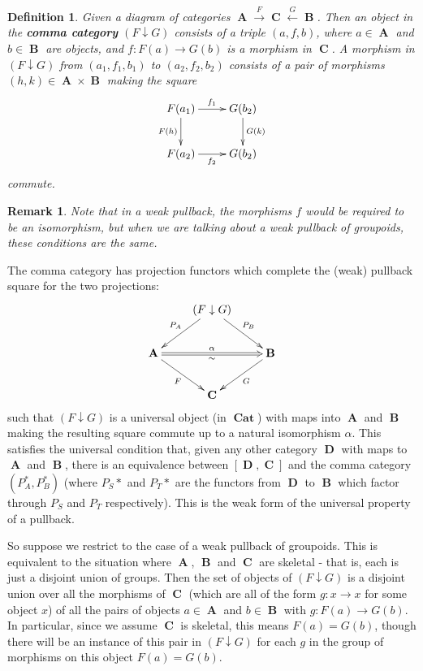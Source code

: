 \documentclass[10pt]{amsart}
\numberwithin{theorem}{subsection}
\newtheorem{definition}[theorem]{Definition}
\newtheorem{varremark}[theorem]{Remark}
\newenvironment{remark}{\begin{varremark}\em}{\em\end{varremark}}
\newcommand{\ra}{\mathop{\rightarrow}}
\newcommand{\ralim}{\mathop{\ra}\limits}
\newcommand{\la}{\mathop{\leftarrow}}
\newcommand{\lalim}{\mathop{\la}\limits}
\newcommand{\opname}[1]{\operatorname{#1}}
\newcommand{\catname}[1]{\boldsymbol{\opname{{#1}}}}
\newcommand{\Cat}{\catname{Cat}}
\begin{document}
\begin{definition} Given a diagram of categories $\catname{A}
\ralim^{F} \catname{C} \lalim^{G} \catname{B}$.  Then an object in the
\textbf{comma category} $(F \downarrow G)$ consists of a triple
$(a,f,b)$, where $a \in \catname{A}$ and $b \in \catname{B}$ are
objects, and $f : F(a) \ra G(b)$ is a morphism in $\catname{C}$.  A
morphism in $(F \downarrow G)$ from $(a_1,f_1,b_1)$ to $(a_2,f_2,b_2)$
consists of a pair of morphisms $(h,k) \in \catname{A}
\times \catname{B}$ making the square
\begin{equation}\label{eq:commacatmor}
\xymatrix{
F(a_1) \ar[r]^{f_1} \ar[d]_{F(h)} & G(b_2) \ar[d]^{G(k)} \\ F(a_2)
\ar[r]_{f_2} & G(b_2) }
\end{equation}
commute.
\end{definition}

\begin{remark}Note that in a weak pullback, the morphisms $f$ would be
required to be an \textit{isomorphism}, but when we are talking about
a weak pullback of groupoids, these conditions are the same.\end{remark}

The comma category has projection functors which complete the (weak)
pullback square for the two projections:
\begin{equation}
\xymatrix{   & (F \downarrow G) \ar_{P_A}[ld] \ar^{P_B}[rd] & \\
   \catname{A}\ar_{F}[rd] \ar@{=>}[rr]^{\alpha}_{\sim} & & \catname{B}\ar^{G}[ld] \\
   & \catname{C} & \\
}
\end{equation}
such that $(F \downarrow G)$ is a universal object (in $\Cat$) with
maps into $\catname{A}$ and $\catname{B}$ making the resulting square
commute up to a natural isomorphism $\alpha$.  This satisfies the
universal condition that, given any other category $\catname{D}$ with
maps to $\catname{A}$ and $\catname{B}$, there is an equivalence
between $[\catname{D},\catname{C}]$ and the comma category
$(P_A^{\ast},P_B^{\ast})$ (where $P_S*$ and $P_T*$ are the functors
from $\catname{D}$ to $\catname{B}$ which factor through $P_S$ and
$P_T$ respectively).  This is the weak form of the universal property
of a pullback.

So suppose we restrict to the case of a weak pullback of groupoids.
This is equivalent to the situation where $\catname{A}$, $\catname{B}$
and $\catname{C}$ are skeletal - that is, each is just a disjoint
union of groups.  Then the set of objects of $(F \downarrow G)$ is a
disjoint union over all the morphisms of $\catname{C}$ (which are all
of the form $g: x \ra x$ for some object $x$) of all the pairs of
objects $a \in \catname{A}$ and $b \in \catname{B}$ with $g: F(a) \ra
G(b)$.  In particular, since we assume $\catname{C}$ is skeletal, this
means $F(a) = G(b)$, though there will be an instance of this pair in
$(F \downarrow G)$ for each $g$ in the group of morphisms on this
object $F(a) = G(b)$.
\end{document}
